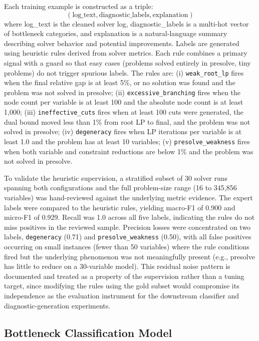 \documentclass[11pt]{article}
\begin{document}
Each training example is constructed as a triple:
\begin{equation}
    (\text{log\_text}, \text{diagnostic\_labels}, \text{explanation})
\end{equation}
where log\_text is the cleaned solver log, 
diagnostic\_labels is a multi-hot vector of bottleneck categories, and 
explanation is a natural-language summary describing solver behavior and potential improvements. 
Labels are generated using heuristic rules derived from solver metrics. Each rule combines a primary signal with a guard so that easy cases (problems solved entirely in presolve, tiny problems) do not trigger spurious labels. The rules are: (i) \texttt{weak\_root\_lp} fires when the final relative gap is at least 5\%, or no solution was found and the problem was not solved in presolve; (ii) \texttt{excessive\_branching} fires when the node count per variable is at least 100 and the absolute node count is at least 1{,}000; (iii) \texttt{ineffective\_cuts} fires when at least 100 cuts were generated, the dual bound moved less than 1\% from root LP to final, and the problem was not solved in presolve; (iv) \texttt{degeneracy} fires when LP iterations per variable is at least 1.0 and the problem has at least 10 variables; (v) \texttt{presolve\_weakness} fires when both variable and constraint reductions are below 1\% and the problem was not solved in presolve.

To validate the heuristic supervision, a stratified subset of 30 solver runs spanning both configurations and the full problem-size range (16 to 345{,}856 variables) was hand-reviewed against the underlying metric evidence.
The expert labels were compared to the heuristic rules, yielding macro-F1 of 0.900 and micro-F1 of 0.929.
Recall was 1.0 across all five labels, indicating the rules do not miss positives in the reviewed sample.
Precision losses were concentrated on two labels, \texttt{degeneracy} (0.71) and \texttt{presolve\_weakness} (0.50), with all false positives occurring on small instances (fewer than 50 variables) where the rule conditions fired but the underlying phenomenon was not meaningfully present (e.g., presolve has little to reduce on a 30-variable model).
This residual noise pattern is documented and treated as a property of the supervision rather than a tuning target, since modifying the rules using the gold subset would compromise its independence as the evaluation instrument for the downstream classifier and diagnostic-generation experiments.

\subsection{Bottleneck Classification Model}
\label{sec:bottleneck-classifier}
\end{document}

